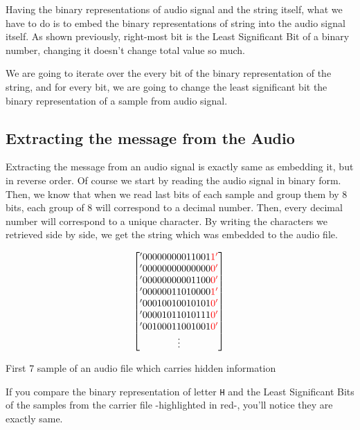 \documentclass[twocolumns]{IEEEtran}
\begin{document}
	Having the binary representations of audio signal and the string itself, what we have to do is to embed the binary representations of string into the audio signal itself. As shown previously, right-most bit is the Least Significant Bit of a binary number, changing it doesn't change total value so much.
	
	We are going to iterate over the every bit of the binary representation of the string, and for every bit, we are going to change the least significant bit the binary representation of a sample from audio signal.
	
	\subsection{Extracting the message from the Audio}
	
	Extracting the message from an audio signal is exactly same as embedding it, but in reverse order. Of course we start by reading the audio signal in binary form. Then, we know that when we read last bits of each sample and group them by 8 bits, each group of 8 will correspond to a decimal number. Then, every decimal number will correspond to a unique character. By writing the characters we retrieved side by side, we get the string which was embedded to the audio file.
	
	\begin{equation}
			\begin{bmatrix}
				'00000000011001\color{red}1' \\
				'00000000000000\color{red}0' \\
				'00000000001100\color{red}0' \\
				'00000011010000\color{red}1' \\
				'00010010010101\color{red}0' \\
				'00001011010111\color{red}0' \\
				'00100011001001\color{red}0' \\
			\vdots
			\end{bmatrix} \\ \\		
		\end{equation}
	\begin{center}
		First 7 sample of an audio file which carries hidden information
	\end{center}
	If you compare the binary representation of letter \texttt{H} and the Least Significant Bits of the samples from the carrier file -highlighted in red-, you'll notice they are exactly same.
	
\end{document}
